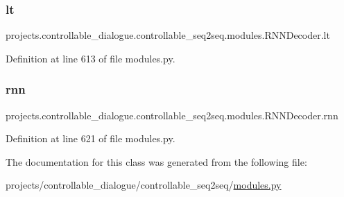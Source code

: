 \subsubsection{\texorpdfstring{lt}{lt}}
{\footnotesize\ttfamily projects.\+controllable\+\_\+dialogue.\+controllable\+\_\+seq2seq.\+modules.\+R\+N\+N\+Decoder.\+lt}



Definition at line 613 of file modules.\+py.

\mbox{\label{classprojects_1_1controllable__dialogue_1_1controllable__seq2seq_1_1modules_1_1RNNDecoder_a5e55e3e3d33925663a7ea879983a0111}} 
\subsubsection{\texorpdfstring{rnn}{rnn}}
{\footnotesize\ttfamily projects.\+controllable\+\_\+dialogue.\+controllable\+\_\+seq2seq.\+modules.\+R\+N\+N\+Decoder.\+rnn}



Definition at line 621 of file modules.\+py.



The documentation for this class was generated from the following file\+:\begin{DoxyCompactItemize}
\item 
projects/controllable\+\_\+dialogue/controllable\+\_\+seq2seq/\hyperlink{projects_2controllable__dialogue_2controllable__seq2seq_2modules_8py}{modules.\+py}\end{DoxyCompactItemize}
